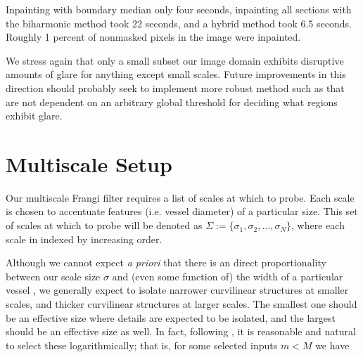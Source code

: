     Inpainting with boundary median only four seconds, inpainting all sections with the biharmonic method took 22 seconds, and a hybrid method took 6.5 seconds. Roughly 1 percent of nonmasked pixels in the image were inpainted.

%    
%    
%    

    
    We stress again that only a small subset our image domain exhibits disruptive amounts of glare for anything except small scales. Future improvements in this direction should probably seek to implement more robust method such as \cite{lange2005glare} that are not dependent on an arbitrary global
    threshold for deciding what regions exhibit glare.
    
    
\section{Multiscale Setup}

    Our multiscale Frangi filter requires a list of scales at which to probe. Each scale is chosen to accentuate features (i.e. vessel diameter) of a particular size.
    This set of scales at which to probe will be denoted as $\Sigma := \{ \sigma_1, \sigma_2, \dots, \sigma_N\}$, where each scale in indexed by increasing order.
    
    Although we cannot expect \textit{a priori} that there is an direct proportionality between our scale size $\sigma$ and (even some function of) the width of a particular vessel \cite{frangi-paper}, we generally expect to isolate
    narrower curvilinear structures at smaller scales, and thicker curvilinear structures at larger scales.  The smallest one should be an effective size where details are expected to be isolated, and the largest should be an effective size as well. In fact, following \cite{Koenderink}, it is reasonable and natural to select these logarithmically; that is, for some selected inputs $m < M$ we have
    
